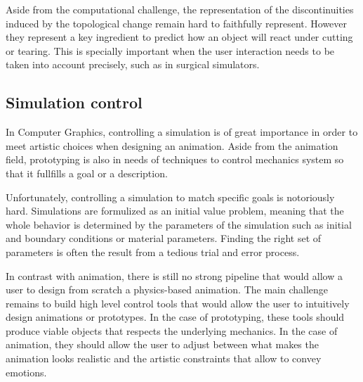 Aside from the computational challenge, the representation of the discontinuities induced by the topological change remain hard to faithfully represent. However they represent a key ingredient to predict how an object will react under cutting or tearing. This is specially important when the user interaction needs to be taken into account precisely, such as in surgical simulators.

\subsection{Simulation control}

In Computer Graphics, controlling a simulation is of great importance in order to meet artistic choices when designing an animation. Aside from the animation field, prototyping is also in needs of techniques to control mechanics system so that it fullfills a goal or a description.

Unfortunately, controlling a simulation to match specific goals is notoriously hard. Simulations are formulized as an initial value problem, meaning that the whole behavior is determined by the parameters of the simulation such as initial and boundary conditions or material parameters. Finding the right set of parameters is often the result from a tedious trial and error process.

In contrast with animation, there is still no strong pipeline that would allow a user to design from scratch a physics-based animation. The main challenge remains to build high level control tools that would allow the user to intuitively design animations or prototypes. In the case of prototyping, these tools should produce viable objects that respects the underlying mechanics. In the case of animation, they should allow the user to adjust between what makes the animation looks realistic and the artistic constraints that allow to convey emotions. 

